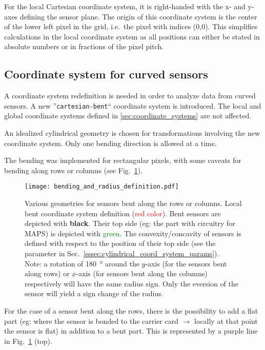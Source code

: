 For the local Cartesian coordinate system, it is right-handed with the x- and y-axes defining the sensor plane.  The origin of this coordinate system is the center of the lower left pixel in the grid, i.e.\ the pixel with indices (0,0).  This simplifies calculations in the local coordinate system as all positions can either be stated in absolute numbers or in fractions of the pixel pitch.

\subsection{Coordinate system for curved sensors}
\label{ssec:bentdetectors}

A coordinate system redefinition is needed in order to analyze data from curved sensors. A new ''\texttt{cartesian-bent}`` coordinate system is introduced. The local and global coordinate systems defined in \ref{sec:coordinate_systems} are not affected.

An idealized cylindrical geometry is chosen for transformations involving the new coordinate system. Only one bending direction is allowed at a time.

The bending was implemented for rectangular pixels, with some caveats for bending along rows or columns (see Fig.~\ref{fig:bent_coord_syst}). 


\begin{figure}[!htp]
\centering
  \texttt{[image: bending\_and\_radius\_definition.pdf]}
  \caption{Various geometries for sensors bent along the rows or columns. Local bent coordinate system definition (\textcolor{red}{red color}). Bent sensors are depicted with \textbf{black}. Their top side (eg: the part with circuitry for MAPS) is depicted with \textcolor{green}{green}. The convexity/concavity of sensors is defined with respect to the position of their top side (see the parameter \protect{} in Sec.~\ref{sssec:cylindrical_coord_system_params}). \\ Note: a rotation of \SI{180}{\degree} around the $y$-axis (for the sensors bent along rows) or $x$-axis (for sensors bent along the columns) respectively will have the same radius sign. Only the eversion of the sensor will yield a sign change of the radius.}
\label{fig:bent_coord_syst}
\end{figure}


For the case of a sensor bent along the rows, there is the possibility to add a flat part (eg: where the sensor is bonded to the carrier card $\rightarrow$ locally at that point the sensor is flat) in addition to a bent part. This is represented by a purple line in Fig.~\ref{fig:bent_coord_syst} (top).


